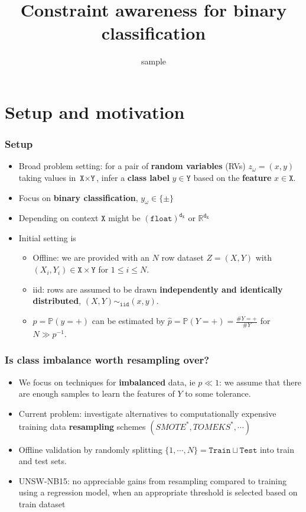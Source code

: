 \documentclass{beamer}
\title{Constraint awareness for binary classification}
\subtitle{sample}
\newcommand{\IN}{{\texttt{X}}}
\newcommand{\OUT}{{\texttt{Y}}}
\newcommand{\DIM}{{\texttt{d}}}
\newcommand{\TWO}{\{\pm\}}
\newcommand{\TRN}{{\texttt{Train}}}
\newcommand{\TST}{{\texttt{Test}}}
\newcommand{\Prob}{{\mathbb P}}
\newcommand{\ProbH}{{\widehat{\mathbb P}}}
\begin{document}
\begin{frame}
\titlepage
\end{frame}

\section{Setup and motivation}
\begin{frame}
\frametitle{Setup}
\begin{itemize}
\item
  Broad problem setting: for a pair of \textbf{random variables} (RVs) $z_\omega=(x,y)$ taking values in $\IN\times\OUT$, infer a \textbf{class label} $y\in\OUT$ based on the \textbf{feature} $x\in\IN$.
\item
  Focus on \textbf{binary classification}, $y_\omega\in\TWO$
\item
  Depending on context $\IN$ might be $\left(\texttt{float}\right)^{\DIM_\IN}$ or $\mathbb R^{\DIM_\IN}$
\item Initial setting is
    \begin{itemize}
\item
  Offline: we are provided with an $N$ row dataset $Z=(X,Y)$ with $(X_i,Y_i)\in\IN\times\OUT$ for $1\leq i\leq N$.
\item
  iid: rows are assumed to be drawn \textbf{independently and identically distributed}, $(X,Y)\sim_{\texttt{iid}}(x,y)$.
\item
  $p=\Prob(y=+)$ can be estimated by $\hat p=\ProbH(Y=+)=\tfrac{\#Y=+}{\#Y}$ for $N\gg p^{-1}$.
    \end{itemize}
\end{itemize}
\end{frame}
\begin{frame}
\frametitle{Is class imbalance worth resampling over?}
\begin{itemize}
\item
  We focus on techniques for \textbf{imbalanced} data, ie $p\ll1$: we assume that there are enough samples to learn the features of $Y$ to some tolerance.
\item
  Current problem: investigate alternatives to computationally expensive training data \textbf{resampling} schemes $(SMOTE^*,TOMEKS^*,\cdots)$
\item
Offline validation by randomly splitting $\{1,\cdots,N\}=\TRN\sqcup\TST$ into train and test sets.
\item
  UNSW-NB15: no appreciable gains from resampling compared to training using a regression model, when an appropriate threshold is selected based on train dataset
\end{itemize}
\end{frame}
\end{document}
